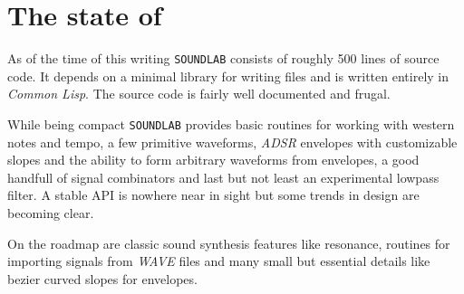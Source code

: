 \section{The state of }

As of the time of this writing \texttt{SOUNDLAB} consists of roughly 500
lines of source code. It depends on a minimal library for writing
 files and is written entirely in \textit{Common Lisp}. The
source code is fairly well documented and frugal.

While being compact \texttt{SOUNDLAB} provides basic routines for working
with western notes and tempo, a few primitive waveforms, \textit{ADSR}
envelopes with customizable slopes and the ability to form arbitrary
waveforms from envelopes, a good handfull of signal combinators and last
but not least an experimental lowpass filter. A stable API is nowhere
near in sight but some trends in design are becoming clear.

On the roadmap are classic sound synthesis features like resonance,
routines for importing signals from \textit{WAVE} files and many small
but essential details like bezier curved slopes for envelopes.
